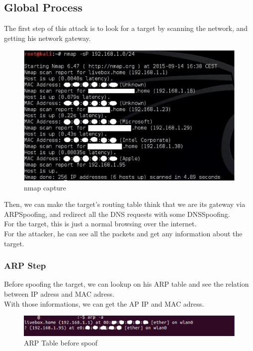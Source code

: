 \documentclass[a4paper, 11pt, oneside]{article}
\begin{document}
\subsection{Global Process}
The first step of this attack is to look for a target by scanning the network, and getting his network gateway. \\
\begin{figure}[!h]
	\centering
	\includegraphics[scale=0.75]{../images/captureNMAP.eps}
	\caption{nmap capture} %
	\label{nmap_capture} %
\end{figure}
Then, we can make the target's routing table think that we are its gateway via ARPSpoofing, and redirect all the DNS requests with some DNSSpoofing.\\
For the target, this is just a normal browsing over the internet.\\
For the attacker, he can see all the packets and get any information about the target.\\


\subsubsection{ARP Step}
Before spoofing the target, we can lookup on his ARP table and see the relation between IP adress and MAC adress. \\
With those informations, we can get the AP IP and MAC adress. \\
\begin{figure}[!h]
	\centering
	\includegraphics[scale=0.75]{../images/arpTableBeforeSpoof.eps}
	\caption{ARP Table before spoof}
	\label{ARP_before_spoof}
\end{figure}
\end{document}
